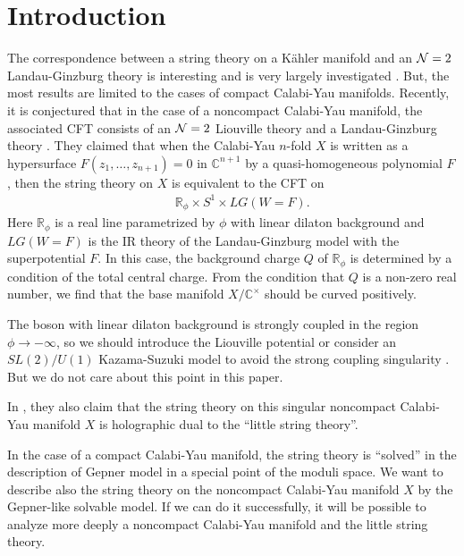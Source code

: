 \documentclass[a4paper,12pt]{article}
\numberwithin{equation}{section}
\newcommand{\Cb}{{\mathbb C}}
\newcommand{\Cx}{{\mathbb C}^{\times}}
\newcommand{\Ncal}{{\cal N}}
\newcommand{\Rb}{{\mathbb R}}
\begin{document}
\newpage
%
%

\section{Introduction}
The correspondence between a string theory on a K\"ahler manifold
 and an $\Ncal=2$ Landau-Ginzburg theory
is interesting and is very largely investigated
\cite{Gep87,Gep88,Vaf89,IV90}. But, the most results are
limited to the cases of compact Calabi-Yau manifolds.
Recently, it is conjectured that
in the case of a noncompact Calabi-Yau manifold, the associated
CFT consists of an $\Ncal=2$ Liouville theory and a
Landau-Ginzburg theory
\cite{GKP9907}.
They claimed that when the
Calabi-Yau $n$-fold $X$ is written as a hypersurface
 $F(z_1,\dots,z_{n+1})=0$ in $\Cb^{n+1}$
by a quasi-homogeneous polynomial $F$, 
then the string theory on $X$ is equivalent to the CFT on
\begin{eqnarray*}
 && \Rb_{\phi}\times S^1 \times LG(W=F).
\end{eqnarray*}
Here $\Rb_{\phi}$ is a real line parametrized by $\phi$
with linear dilaton background and
 $LG(W=F)$ is the IR theory of the Landau-Ginzburg model with
the superpotential $F$. In this case, the background charge $Q$ 
of $\Rb_{\phi}$ is
determined by a condition of the total central charge.
From the condition that $Q$ is a non-zero real number, we find
that the base manifold $X/\Cx$ should be curved positively.

The boson with linear dilaton background is strongly coupled
in the region $\phi\to -\infty$, so we should introduce
the Liouville potential or consider an $SL(2)/U(1)$ Kazama-Suzuki
model to avoid the strong coupling singularity
\cite{OV9511,GK9909,GK9911}. But we do not care about this point
in this paper.

In \cite{ABKS9808,GKP9907,GK9909,GK9911}, they also claim that
the string theory on this singular noncompact Calabi-Yau
manifold $X$ is holographic dual to the ``little string theory''.

In the case of a compact Calabi-Yau manifold, 
the string theory is ``solved'' in the description
of Gepner model in a special point of the moduli space.
We want to describe also the string theory on the noncompact 
Calabi-Yau manifold $X$ by the Gepner-like solvable model.
If we can do it successfully, it will be possible to analyze
more deeply
a noncompact Calabi-Yau manifold and the little string theory.
\end{document}
